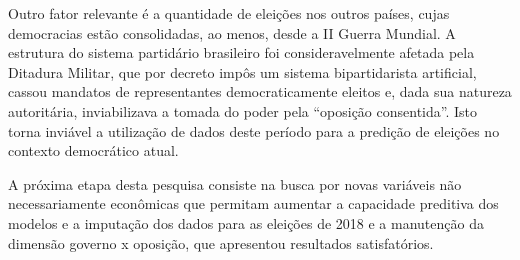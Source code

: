 \documentclass[
	article,			%
	11pt,				%
	oneside,			%
	a4paper,			%
	english,			%
	brazil,				%
	sumario=tradicional
	]{abntex2}
\begin{document}
Outro fator relevante é a quantidade de eleições nos outros países, cujas democracias estão consolidadas, ao menos, desde a II Guerra Mundial. A estrutura do sistema partidário brasileiro foi consideravelmente afetada pela Ditadura Militar, que por decreto impôs um sistema bipartidarista artificial, cassou mandatos de representantes democraticamente eleitos e, dada sua natureza autoritária, inviabilizava a tomada do poder pela ``oposição consentida''. Isto torna inviável a utilização de dados deste período para a predição de eleições no contexto democrático atual.

A próxima etapa desta pesquisa consiste na busca por novas variáveis não necessariamente econômicas que permitam aumentar a capacidade preditiva dos modelos e a imputação dos dados para as eleições de 2018 e a manutenção da dimensão governo x oposição, que apresentou resultados satisfatórios.


\end{document}

